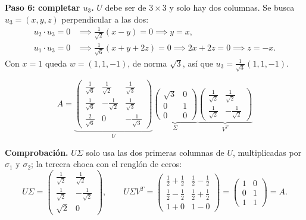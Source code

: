 \documentclass[11pt,letterpaper]{article}
\begin{document}
\begin{ejemplo}
    \textbf{Paso 6: completar $u_3$.} $U$ debe ser de $3 \times 3$ y
    solo hay dos columnas. Se busca $u_3 = (x, y, z)$ perpendicular a
    las dos:
    \begin{align*}
        u_2 \cdot u_3 = 0 &\implies \tfrac{1}{\sqrt{2}}(x - y) = 0
            \implies y = x , \\
        u_1 \cdot u_3 = 0 &\implies \tfrac{1}{\sqrt{6}}(x + y + 2z)
            = 0 \implies 2x + 2z = 0 \implies z = -x .
    \end{align*}
    Con $x = 1$ queda $w = (1, 1, -1)$, de norma $\sqrt{3}$, así que
    $u_3 = \tfrac{1}{\sqrt{3}}(1, 1, -1)$.
\end{ejemplo}

\begin{resultado}
    \[
        A =
        \underbrace{\begin{pmatrix}
            \tfrac{1}{\sqrt{6}} & \tfrac{1}{\sqrt{2}} &
                \tfrac{1}{\sqrt{3}} \\[3pt]
            \tfrac{1}{\sqrt{6}} & -\tfrac{1}{\sqrt{2}} &
                \tfrac{1}{\sqrt{3}} \\[3pt]
            \tfrac{2}{\sqrt{6}} & 0 & -\tfrac{1}{\sqrt{3}}
        \end{pmatrix}}_{U}
        \underbrace{\begin{pmatrix} \sqrt{3} & 0 \\ 0 & 1 \\ 0 & 0
        \end{pmatrix}}_{\Sigma}
        \underbrace{\begin{pmatrix}
            \tfrac{1}{\sqrt{2}} & \tfrac{1}{\sqrt{2}} \\[3pt]
            \tfrac{1}{\sqrt{2}} & -\tfrac{1}{\sqrt{2}}
        \end{pmatrix}}_{V^{T}}
    \]
\end{resultado}

\textbf{Comprobación.} $U\Sigma$ solo usa las dos primeras columnas de
$U$, multiplicadas por $\sigma_1$ y $\sigma_2$; la tercera choca con
el renglón de ceros:
\[
    U\Sigma = \begin{pmatrix}
        \tfrac{1}{\sqrt{2}} & \tfrac{1}{\sqrt{2}} \\[3pt]
        \tfrac{1}{\sqrt{2}} & -\tfrac{1}{\sqrt{2}} \\[3pt]
        \sqrt{2} & 0
    \end{pmatrix} ,
    \qquad
    U\Sigma V^{T} = \begin{pmatrix}
        \tfrac{1}{2} + \tfrac{1}{2} & \tfrac{1}{2} - \tfrac{1}{2}
            \\[3pt]
        \tfrac{1}{2} - \tfrac{1}{2} & \tfrac{1}{2} + \tfrac{1}{2}
            \\[3pt]
        1 + 0 & 1 - 0
    \end{pmatrix}
    = \begin{pmatrix} 1 & 0 \\ 0 & 1 \\ 1 & 1 \end{pmatrix} = A .
\]
\end{document}
